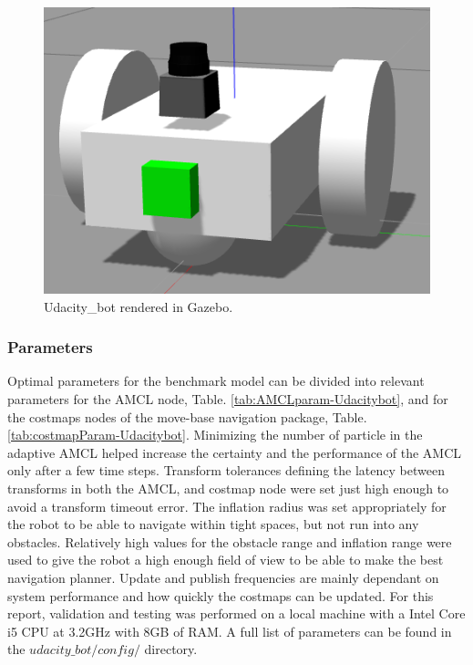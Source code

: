 \documentclass[10pt,journal,compsoc]{IEEEtran}
\begin{document}
\begin{figure}[thpb]
    \centering
    \includegraphics[width=\linewidth]{../img/urdf_udacity_bot.png}
    \caption{Udacity\_bot rendered in Gazebo.}
    \label{fig:udacity-bot-design}
\end{figure}

\subsubsection{Parameters}

Optimal parameters for the benchmark model can be divided into relevant parameters for the AMCL node, Table. \ref{tab:AMCLparam-Udacitybot}, and for the costmaps nodes of the move-base navigation package, Table. \ref{tab:costmapParam-Udacitybot}. Minimizing the number of particle in the adaptive AMCL helped increase the certainty and the performance of the AMCL only after a few time steps. Transform tolerances defining the latency between transforms in both the AMCL, and costmap node were set just high enough to avoid a transform timeout error. The inflation radius was set appropriately for the robot to be able to navigate within tight spaces, but not run into any obstacles. Relatively high values for the obstacle range and inflation range were used to give the robot a high enough field of view to be able to make the best navigation planner. Update and publish frequencies are mainly dependant on system performance and how quickly the costmaps can be updated. For this report, validation and testing was performed on a local machine with a Intel Core i5 CPU at 3.2GHz with 8GB of RAM. A full list of parameters can be found in the \textit{$udacity\_bot/config/$} directory.
\end{document}
